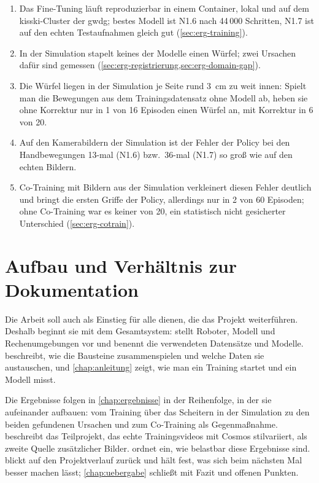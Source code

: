 \begin{enumerate}
  \item Das Fine-Tuning läuft reproduzierbar in einem Container, lokal und auf dem
    \acs{kisski}-Cluster der \acs{gwdg}; bestes Modell ist N1.6 nach 44\,000 Schritten, N1.7
    ist auf den echten Testaufnahmen gleich gut (\cref{sec:erg-training}).
  \item In der Simulation stapelt keines der Modelle einen Würfel; zwei Ursachen dafür sind
    gemessen (\cref{sec:erg-registrierung,sec:erg-domain-gap}).
  \item Die Würfel liegen in der Simulation je Seite rund 3~cm zu weit innen: Spielt man die
    Bewegungen aus dem Trainingsdatensatz ohne Modell ab, heben sie ohne Korrektur nur in
    1 von 16 Episoden einen Würfel an, mit Korrektur in 6 von 20.
  \item Auf den Kamerabildern der Simulation ist der Fehler der Policy bei den Handbewegungen
    13-mal (N1.6) bzw.\ 36-mal (N1.7) so groß wie auf den echten Bildern.
  \item Co-Training mit Bildern aus der Simulation verkleinert diesen Fehler deutlich und bringt
    die ersten Griffe der Policy, allerdings nur in 2 von 60 Episoden; ohne Co-Training war es
    keiner von 20, ein statistisch nicht gesicherter Unterschied (\cref{sec:erg-cotrain}).
\end{enumerate}

\section{Aufbau und Verhältnis zur Dokumentation}
\label{sec:aufbau}
\label{sec:doku-verhaeltnis}

Die Arbeit soll auch als Einstieg für alle dienen, die das Projekt weiterführen. Deshalb
beginnt sie mit dem Gesamtsystem:  stellt Roboter, Modell und
Rechenumgebungen vor und benennt die verwendeten Datensätze und Modelle.
 beschreibt, wie die Bausteine zusammenspielen und welche Daten sie
austauschen, und \cref{chap:anleitung} zeigt, wie man ein Training startet und ein Modell
misst.

Die Ergebnisse folgen in \cref{chap:ergebnisse} in der Reihenfolge, in der sie aufeinander
aufbauen: vom Training über das Scheitern in der Simulation zu den beiden gefundenen Ursachen
und zum Co-Training als Gegenmaßnahme.  beschreibt das Teilprojekt, das
echte Trainingsvideos mit Cosmos stilvariiert, als zweite Quelle zusätzlicher Bilder.
 ordnet ein, wie belastbar diese
Ergebnisse sind.  blickt auf den Projektverlauf zurück und hält fest,
was sich beim nächsten Mal besser machen lässt; \cref{chap:uebergabe} schließt mit Fazit und
offenen Punkten.

